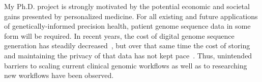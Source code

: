 \documentclass[a4paper,11pt]{article}
\begin{document}
\begin{refsection}
\begin{comment}
Justify how the chosen research approach (if successful) is the appropriate one to achieve the anticipated application(s) (potentially long term).

Elaborate the strategic importance of the potential applications to possible users (impact). 
Show how (if the project is successful) new products, services and/or processes may affect business of specific companies, a collective of companies and/or a sector and/or may be closely aligned with the Flemish science, technology and innovation transition priorities  (Flanders in transition. Priorities in Science, Technology and Innovation towards 2025) (socio-economic benefits). 

Societal impact should always be linked to a (in)direct (macro)economic benefit, e.g. cost reductions in health care, higher education level, environmental impact etc. should be positioned in an economic context.
\end{comment}
\smallskip

My Ph.D. project is strongly motivated by the potential economic and societal gains presented by personalized medicine. 
For all existing and future applications of genetically-informed precision health, patient genome sequence data in some form will be required.
In recent years, the cost of digital genome sequence generation has steadily decreased~\cite{wetterstrand_cost_2021}, but over that same time the cost of storing and maintaining the privacy of that data has not kept pace~\cite{}.
Thus, unintended barriers to scaling current clinical genomic workflows as well as to researching new workflows have been observed.


\end{refsection}
\end{document}
